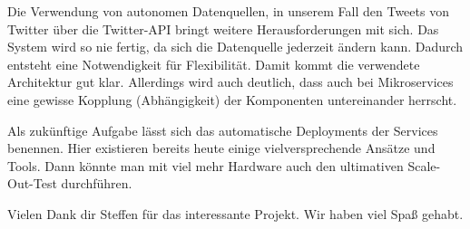 Die Verwendung von autonomen Datenquellen, in unserem Fall den Tweets
von Twitter über die Twitter-API bringt weitere Herausforderungen mit
sich. Das System wird so nie fertig, da sich die Datenquelle jederzeit
ändern kann. Dadurch entsteht eine Notwendigkeit für Flexibilität.
Damit kommt die verwendete Architektur gut klar. Allerdings wird auch
deutlich, dass auch bei Mikroservices eine gewisse Kopplung
(Abhängigkeit) der Komponenten untereinander herrscht.

Als zukünftige Aufgabe lässt sich das automatische Deployments der
Services benennen. Hier existieren bereits heute einige
vielversprechende Ansätze und Tools. Dann könnte man mit viel mehr
Hardware auch den ultimativen Scale-Out-Test durchführen.

Vielen Dank dir Steffen für das interessante Projekt. Wir haben viel Spaß gehabt.